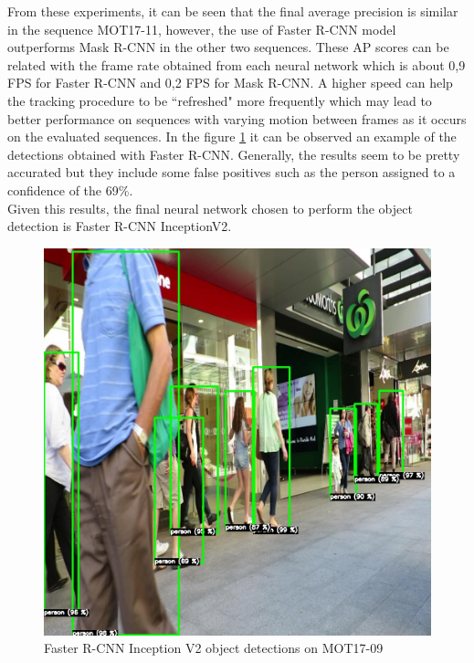 From these experiments, it can be seen that the final average precision is similar in the sequence MOT17-11, however, the use of Faster R-CNN model outperforms Mask R-CNN in the other two sequences. These AP scores can be related with the frame rate obtained from each neural network which is about 0,9 FPS for Faster R-CNN and 0,2 FPS for Mask R-CNN. A higher speed can help the tracking procedure to be ``refreshed" more frequently which may lead to better performance on sequences with varying motion between frames as it occurs on the evaluated sequences. In the figure \ref{fig:faster_dets} it can be observed an example of the detections obtained with Faster R-CNN. Generally, the results seem to be pretty accurated but they include some false positives such as the person assigned to a confidence of the 69\%.\\
Given this results, the final neural network chosen to perform the object detection is Faster R-CNN InceptionV2.
\begin{figure}[H]
\begin{center}
\includegraphics[scale=0.2]{figures/212.jpg}
\caption{Faster R-CNN Inception V2 object detections on MOT17-09}
\label{fig:faster_dets}
\end{center}
\end{figure}
